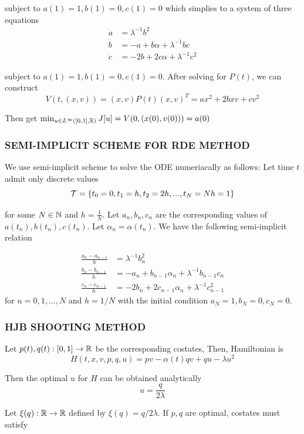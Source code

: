 subject to $a(1) = 1, b(1) = 0, c(1) = 0$ which simplies to a system of three equations
\begin{align*}
	\dot{a} &= \lambda^{-1} b^2 \\
	\dot{b} &= - a + b\alpha + \lambda^{-1} bc \\
	\dot{c} &= - 2 b + 2 c \alpha + \lambda^{-1} c^2
\end{align*}

subject to $a(1) = 1, b(1) = 0, c(1) = 0$. After solving for $P(t)$, we can construct 
$$
	V(t, (x, v)) = (x, v) P(t) (x, v)^T = a x^2 + 2 b x v + c v^2
$$

Then get $\min_{u \in L^\infty([0, 1], \mathbb{R})} J[u] = V(0, (x(0), v(0))) = a(0)$

\subsubsection{SEMI-IMPLICIT SCHEME FOR RDE METHOD} 
\label{rde_implicit}
We use semi-implicit scheme to solve the ODE numeriacally as follows: Let time $t$ admit only discrete values 
$$
\mathcal{T} = \{t_0 = 0, t_1 = h, t_2 = 2h, ..., t_N = Nh = 1\}
$$

for some $N \in \mathbb{N}$ and $h = \frac{1}{N}$. Let $a_n, b_n, c_n$ are the corresponding values of $a(t_n), b(t_n), c(t_n)$. Let $\alpha_n = \alpha(t_n)$. We have the following semi-implicit relation

\begin{align*}
	\frac{a_n - a_{n-1}}{h} &= \lambda^{-1} b_{n}^2 \\
	\frac{b_n - b_{n-1}}{h} &= - a_n + b_{n-1} \alpha_n + \lambda^{-1} b_{n-1} c_n \\
	\frac{c_n - c_{n-1}}{h} &= - 2 b_n + 2 c_{n-1} \alpha_n+ \lambda^{-1} c_{n-1}^2
\end{align*}
for $n=0, 1, ..., N$ and $h = 1 / N$ with the initial condition $a_N = 1, b_N = 0, c_N = 0$.

\subsubsection{HJB SHOOTING METHOD}
\label{hjb_shooting}

Let $p(t), q(t): [0, 1] \to \mathbb{R}$ be the corresponding costates, Then, Hamiltonian is
$$
	H(t, x, v, p, q, u) = pv - \alpha(t) q v + q u - \lambda u^2
$$

Then the optimal $u$ for $H$ can be obtained analytically
$$
	u = \frac{q}{2 \lambda}
$$

Let $\xi(q): \mathbb{R} \to \mathbb{R}$ defined by $\xi(q) = q / 2 \lambda$. If $p, q$ are optimal, costates must satisfy

